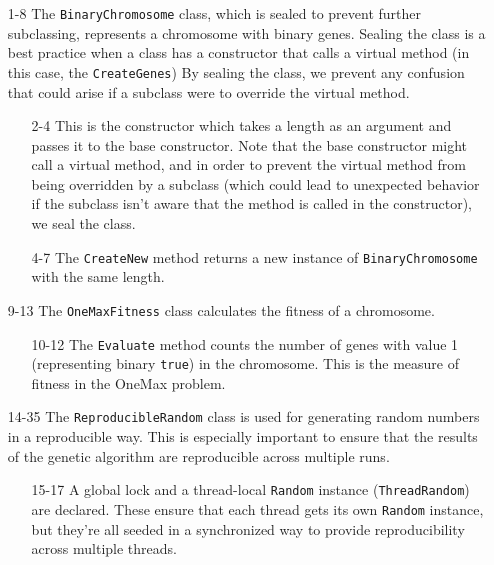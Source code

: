   \begin{enumerate}
    \item[1-8] The \texttt{BinaryChromosome} class, which is sealed to 
      prevent further subclassing, represents a chromosome with binary genes.
      Sealing the class is a best practice when a class has a constructor 
      that calls a virtual method (in this case, the \texttt{CreateGenes})
      By sealing the class, we prevent any confusion that could arise if a 
      subclass were to override the virtual method.
      \begin{enumerate}
        \item[2-4] This is the constructor which takes a length as an argument 
          and passes it to the base constructor.
          Note that the base constructor might call a virtual method, and in 
          order to prevent the virtual method from being overridden by a 
          subclass (which could lead to unexpected behavior if the subclass 
          isn't aware that the method is called in the constructor), we seal 
          the class.
        \item[4-7] The \texttt{CreateNew} method returns a new instance of
          \texttt{BinaryChromosome} with the same length.
      \end{enumerate}
    \item[9-13] The \texttt{OneMaxFitness} class calculates the fitness of a 
      chromosome.
      \begin{enumerate}
        \item[10-12] The \texttt{Evaluate} method counts the number of genes 
          with value 1 (representing binary \texttt{true}) in the 
          chromosome.
          This is the measure of fitness in the OneMax problem.
      \end{enumerate}
    \item[14-35] The \texttt{ReproducibleRandom} class is used for 
      generating random numbers in a reproducible way.
      This is especially important to ensure that the results of the genetic
      algorithm are reproducible across multiple runs.
      \begin{enumerate}
        \item[15-17] A global lock and a thread-local 
          \texttt{Random} instance 
          (\texttt{ThreadRandom}) are declared.
          These ensure that each thread gets its own
          \texttt{Random} instance, but they're all seeded in a 
          synchronized way to provide reproducibility across multiple threads.

\end{enumerate}
\end{enumerate}
